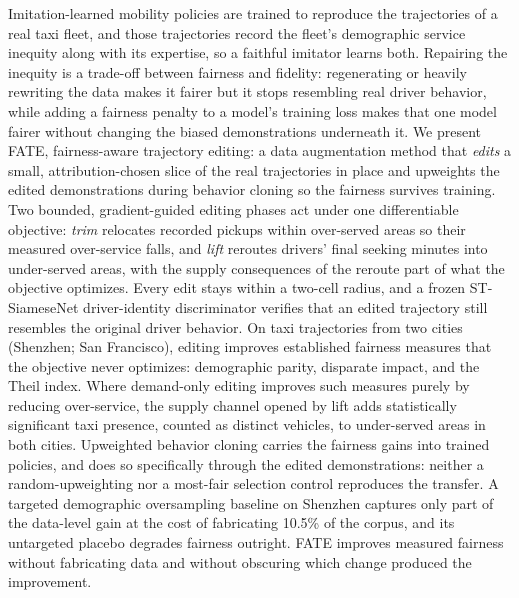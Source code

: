 Imitation-learned mobility policies are trained to reproduce the
trajectories of a real taxi fleet, and those trajectories record the
fleet's demographic service inequity along with its expertise, so a
faithful imitator learns both. Repairing the inequity is a trade-off
between fairness and fidelity: regenerating or heavily rewriting the data
makes it fairer but it stops resembling real driver behavior, while adding 
a fairness penalty to a model's training loss makes that one model fairer 
without changing the biased demonstrations underneath it. We present FATE,
fairness-aware trajectory editing: a data augmentation method that
\emph{edits} a small, attribution-chosen slice of the real trajectories in
place and upweights the edited demonstrations during behavior cloning so
the fairness survives training. Two bounded, gradient-guided editing
phases act under one differentiable objective: \emph{trim} relocates
recorded pickups within over-served areas so their measured over-service
falls, and \emph{lift} reroutes drivers' final seeking minutes into
under-served areas, with the supply consequences of the reroute part of
what the objective optimizes. Every edit stays within a two-cell radius,
and a frozen ST-SiameseNet driver-identity discriminator verifies that an
edited trajectory still resembles the original driver behavior. On taxi trajectories
from two cities (Shenzhen; San Francisco), editing improves established
fairness measures that the objective never optimizes: demographic parity,
disparate impact, and the Theil index. Where demand-only editing improves
such measures purely by reducing over-service, the supply channel opened
by lift adds statistically significant taxi presence, counted as distinct
vehicles, to under-served areas in both cities. Upweighted behavior
cloning carries the fairness gains into trained policies, and does so
specifically through the edited demonstrations: neither a
random-up\-weight\-ing nor a most-fair selection control reproduces the
transfer. A targeted demographic oversampling baseline on Shenzhen
captures only part of the data-level gain at the cost of fabricating
10.5\% of the corpus, and its untargeted placebo degrades fairness
outright. FATE improves measured fairness without fabricating data and
without obscuring which change produced the improvement.
